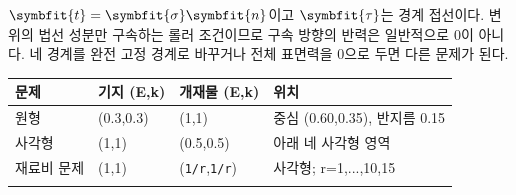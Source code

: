 \documentclass[10pt,a4paper]{article}
\renewcommand{\boldsymbol}[1]{\symbfit{#1}}
\begin{document}
$\boldsymbol t=\boldsymbol\sigma\boldsymbol n$이고 $\boldsymbol\tau$는 경계 접선이다. 변위의 법선 성분만 구속하는 롤러 조건이므로 구속 방향의 반력은 일반적으로 0이 아니다. 네 경계를 완전 고정 경계로 바꾸거나 전체 표면력을 0으로 두면 다른 문제가 된다.\par

\begingroup\small

\par\begin{minipage}{\linewidth}\begin{tabular}{>{\raggedright\arraybackslash}p{}>{\raggedright\arraybackslash}p{}>{\raggedright\arraybackslash}p{}>{\raggedright\arraybackslash}p{}}

\rowcolor{tint} \textbf{문제} & \textbf{기지 (E,k)} & \textbf{개재물 (E,k)} & \textbf{위치}\\\midrule

원형 & (0.3,0.3) & (1,1) & 중심 (0.60,0.35), 반지름 0.15\\\addlinespace[2pt]

사각형 & (1,1) & (0.5,0.5) & 아래 네 사각형 영역\\\addlinespace[2pt]

재료비 문제 & (1,1) & (\nolinkurl{1/r},\nolinkurl{1/r}) & 사각형; r=1,...,10,15\\\addlinespace[2pt]

\bottomrule\end{tabular}\end{minipage}\par\vspace{5pt}\endgroup

\begingroup\small
\end{document}
